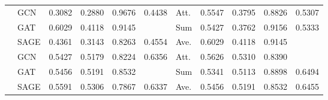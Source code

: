 \begin{table}[t]
{\begin{tabular}{|l|l|c|c|c|c|l|c|c|c|c|}
			\multirow{3}{*}{\Facebook} & GCN   & 0.3082	&0.2880	&0.9676	&0.4438 & Att. & 0.5547	&0.3795	&0.8826	&0.5307 \\
			& GAT   & 0.6029	&0.4118	&0.9145	&\cellcolor{LightYellow}{0.5678} & Sum       & 0.5427	&0.3762	&0.9156	&0.5333 \\
			& SAGE  &0.4361	&0.3143	&0.8263	&0.4554  & Ave.   & 0.6029	&0.4118	&0.9145	&\cellcolor{LightYellow}{0.5678} \\\hline
			\multirow{3}{*}{\Citeseercora} & GCN   & 0.5427 & 0.5179 & 0.8224 & 0.6356 & Att. & 0.5626 & 0.5310 & 0.8390 & \cellcolor{LightYellow}{0.6504} \\
			& GAT   & 0.5456 & 0.5191 & 0.8532 & \cellcolor{LightYellow}{0.6455} & Sum       & 0.5341 & 0.5113 & 0.8898 & 0.6494 \\
			& SAGE  & 0.5591 & 0.5306 & 0.7867 & 0.6337 & Ave. 	& 0.5456 & 0.5191 & 0.8532 & 0.6455\\\hline
		\end{tabular}
	}
\end{table}


